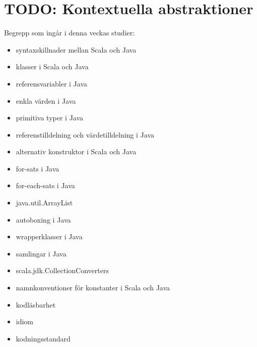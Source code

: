 \chapter{TODO: Kontextuella abstraktioner}\label{chapter:W11}
Begrepp som ingår i denna veckas studier:
\begin{itemize}[noitemsep,label={$\square$},leftmargin=*]
\item syntaxskillnader mellan Scala och Java
\item klasser i Scala och Java
\item referensvariabler i Java
\item enkla värden i Java
\item primitiva typer i Java
\item referenstilldelning och värdetilldelning i Java
\item alternativ konstruktor i Scala och Java
\item for-sats i Java
\item for-each-sats i Java
\item java.util.ArrayList
\item autoboxing i Java
\item wrapperklasser i Java
\item samlingar i Java
\item scala.jdk.CollectionConverters
\item namnkonventioner för konstanter i Scala och Java
\item kodläsbarhet
\item idiom
\item kodningsstandard\end{itemize}
